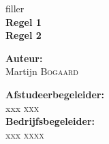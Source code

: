 \frenchspacing

\begin{center}
  filler\\[3cm]
  { \huge \bfseries Regel 1 \\ Regel 2 \\[12cm] } 
  \begin{minipage}{0.4\textwidth}
    \vspace{0pt}
    \begin{flushleft} \large
      \textbf{\Large Auteur:}\\
      \Large Martijn \textsc{Bogaard}
    \end{flushleft}
  \end{minipage}
  \begin{minipage}{0.4\textwidth}
    \vspace{0pt}
    \begin{flushright} \large
      \textbf{\Large Afstudeerbegeleider:} \\
      \Large xxx \textsc{xxx}        \\[1cm]
      \textbf{\Large Bedrijfsbegeleider:} \\
      \Large xxx \textsc{xxxx}
    \end{flushright}
  \end{minipage}
\end{center}